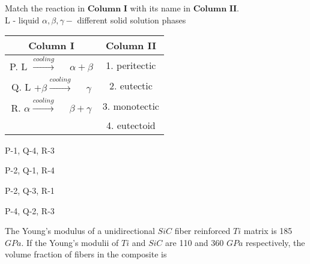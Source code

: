     \item Match the reaction in $\textbf{Column I}$ with its name in $\textbf{Column II}$.\\
        L - liquid $\alpha, \beta, \gamma -$ different solid solution phases
        \begin{center}

            \begin{tabular}{|c|c|} 
                \hline
                \textbf{Column I} & \textbf{Column II}\\
                \hline
                P. L $\xrightarrow{cooling}$ $\quad \alpha + \beta$ & 1. peritectic\\
                \hline
                Q. L $+ \beta \xrightarrow{cooling}$ $\quad \gamma$ & 2. eutectic\\
                \hline
                R. $\alpha \xrightarrow{cooling}$ $\quad \beta + \gamma$ & 3. monotectic\\
                \hline
                \quad & 4. eutectoid\\
                \hline
            \end{tabular}
        \end{center}
        \hfill{}
        \begin{enumerate}
                \begin{multicols}{2}
                \item P-1, Q-4, R-3 \columnbreak 
                \item P-2, Q-1, R-4 
                \end{multicols} 
                \begin{multicols}{2}
                \item P-2, Q-3, R-1 \columnbreak 
                \item P-4, Q-2, R-3 
                \end{multicols}
        \end{enumerate}
    \item The Young's modulus of a unidirectional $SiC$ fiber reinforced $Ti$ matrix is 185 $GPa$.
        If the Young's modulii of $Ti$ and $SiC$ are 110 and 360 $GPa$ respectively, the volume fraction
        of fibers in the composite is 

        \hfill{}



